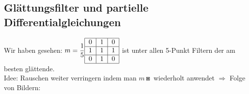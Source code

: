 \documentclass[ngerman]{article}
\theoremstyle{plain}
\theoremstyle{definition}
\numberwithin{equation}{section}
\begin{document}
    \subsection{Glättungsfilter und partielle Differentialgleichungen}

    Wir haben gesehen: $\displaystyle m = \frac{1}{5}\begin{tabular}{|c|c|c|}
        \hline
        0 & 1 & 0\\
        \hline
        1 & 1 & 1\\
        \hline
        0 & 1 & 0\\
        \hline
    \end{tabular}$ ist unter allen 5-Punkt Filtern der am besten glättende.\\
    Idee: Rauschen weiter verringern indem man $m \boxast$ wiederholt anwendet $\Rightarrow$ Folge von Bildern:\\

    \begin{center}
    \end{center}
\end{document}
